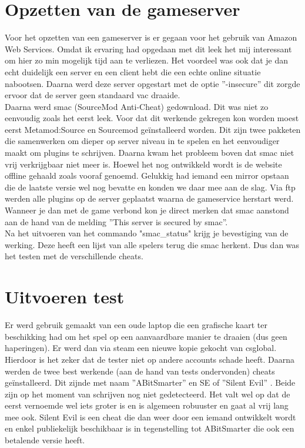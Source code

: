 \documentclass[pdftex,a4paper,12pt,twoside]{report}
\begin{document}
\section{Opzetten van de gameserver}
\label{sec:gameserver}
Voor het opzetten van een gameserver is er gegaan voor het gebruik van Amazon Web Services. Omdat ik ervaring had opgedaan met dit leek het mij interessant om hier zo min mogelijk tijd aan te verliezen. Het voordeel was ook dat je dan echt duidelijk een server en een client hebt die een echte online situatie nabootsen. Daarna werd deze server opgestart met de optie ''-insecure'' dit zorgde ervoor dat de server geen standaard \gls{vac} draaide.
\\

Daarna werd \gls{smac} (SourceMod Anti-Cheat) gedownload. Dit was niet zo eenvoudig zoals het eerst leek. Voor dat dit werkende gekregen kon worden moest eerst Metamod:Source en Sourcemod geïnstalleerd worden. Dit zijn twee pakketen die samenwerken om dieper op server niveau in te spelen en het eenvoudiger maakt om plugins te schrijven.
Daarna kwam het probleem boven dat \gls{smac} niet vrij verkrijgbaar niet meer is. Hoewel het nog ontwikkeld wordt is de website offline gehaald zoals vooraf genoemd. Gelukkig had iemand een mirror opstaan die de laatste versie wel nog bevatte en konden we daar mee aan de slag. Via ftp werden alle plugins op de server geplaatst waarna de gameservice herstart werd. Wanneer je dan met de game verbond kon je direct merken dat \gls{smac} aanstond aan de hand van de melding ''This server is secured by \gls{smac}''. 
\\

Na het uitvoeren van het commando "smac\_status" krijg je bevestiging van de werking. Deze heeft een lijst van alle spelers terug die \gls{smac} herkent. Dus dan was het testen met de verschillende \gls{cheat}s.

\section{Uitvoeren test}
\label{sec:uitvoering}

Er werd gebruik gemaakt van een oude laptop die een grafische kaart ter beschikking had om het spel op een aanvaardbare manier te draaien (dus geen haperingen). Er werd dan via \gls{steam} een nieuwe kopie gekocht van \gls{csglobal}. Hierdoor is het zeker dat de tester niet op andere accounts schade heeft. Daarna werden de twee best werkende (aan de hand van tests ondervonden) \gls{cheat}s geïnstalleerd. Dit zijnde met naam ''ABitSmarter'' \citep{abitsmarter} en SE of ''Silent Evil'' \citep{silentevil}.
Beide zijn op het moment van schrijven nog niet gedetecteerd. Het valt wel op dat de eerst vernoemde wel iets groter is en is algemeen robuuster en gaat al vrij lang mee ook. Silent Evil is een \gls{cheat} die dan weer door een iemand ontwikkelt wordt en enkel publiekelijk beschikbaar is in tegenstelling tot ABitSmarter die ook een betalende versie heeft. 
\\
\end{document}
